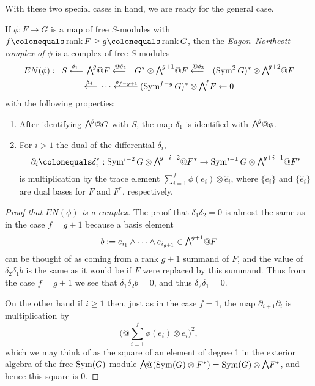 With these two special cases in hand, we are ready for the general
case. 

\begin{definition}
If $\phi: F\to G$ is a map of free $S$-modules with 
$f\colonequals \rank F\geq  g\colonequals  \rank G$, then the
\emph{Eagon--Northcott complex of $\phi$}
%
is a complex of free $S$-modules
\begin{multline*}
EN(\phi): \quad
S \luto{\delta_1}
\mwedge^g @F
\luto{@\delta_{2}}
G^*\otimes \mwedge^{g+1}@ F  \luto{@\delta_{3}}
(\Sym^2G)^*\otimes\mwedge^{g+2}@F  \\
\luto{\delta_{4}}\cdots\luto{\delta_{f-g+1}}\hskip-23pt-\hskip-4pt-
(\Sym^{f-g}G)^*\otimes\mwedge^fF
\leftarrow 0
\end{multline*}
with the following properties:
\begin{enumerate}

\item After identifying $\mwedge^{g}@G$ with $S$, the map $\delta_{1}$
is identified with $\mwedge^{g}@\phi$.

\item For $i>1$ the dual of the differential $\delta_{i}$,
$$
\partial_{i} \colonequals \delta_{i}^{*}: \Sym^{i-2}G \otimes \mwedge^{g+i-2}@F^{*} \to
\Sym^{i-1}G \otimes \mwedge^{g+i-1}@F^{*}
$$ 
is multiplication by the trace element
%
$\sum_{i = 1}^{f} \phi(e_{i}) \otimes \hat e_{i}$,
where
$\{e_{i}\}$ and $\{\hat e_{i}\}$ are dual bases for $F$ and $F^{*}$, respectively.
\end{enumerate}
\end{definition}

\begin{proof}[Proof that $EN(\phi)$ is a complex]
 The proof that $\delta_{1}\delta_{2} = 0$ is almost the same as in the
case $f = g+1$ because
a basis element
$$
b: = e_{i_{1}}\wedge \cdots \wedge e_{i_{g+1}} \in \mwedge^{g+1}@F
$$
can be thought of as coming from a rank $g+1$ summand of $F$, and the
value of $\delta_{2}\delta_{1}b$
is the same as it would be if $F$ were replaced by this summand. Thus
from the case $f=g+1$ we see
that $\delta_{1}\delta_{2}b = 0$, and thus $\delta_{2}\delta_{1} = 0$.

On the other hand if $i\geq 1$ then, just as in the case $f=1$,
 the map $\partial_{i+1}\partial_{i}$
is multiplication by
$$
\biggl(@\sum_{i = 1}^{f} \phi(e_{i}) \otimes \hat e_{i}\biggr)^{\!2},
$$
which we may think of as the square of an element of degree 1 in the
exterior algebra
of the free $\operatorname{Sym}(G)$-module $\mwedge@(\Sym(G)\otimes F^{*}) = \Sym(G)
\otimes \mwedge \,F^{*}$, and hence this square is 0.
\end{proof}

